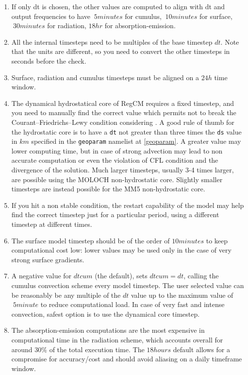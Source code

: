 \begin{enumerate}
\item If only dt is chosen, the other values are computed to align with dt
and output frequencies to have $~5minutes$ for cumulus, $~10minutes$ for
surface, $~30 minutes$ for radiation, $18hr$ for absorption-emission.
\item All the internal timesteps need to be multiples of the base
timestep $dt$.  Note that the units are different, so you need to convert the
other timesteps in seconds before the check.
\item Surface, radiation and cumulus timesteps must be aligned on a $24h$
time window.
\item The dynamical hydrostatical core of RegCM requires a fixed timestep,
and you need to manually find the correct value which permits not to break
the Courant–Friedrichs–Lewy condition considering \cite{CFL}.
A good rule of thumb for the hydrostatic core is to have a \verb=dt= not
greater than three times the \verb=ds= value in $km$ specified in the
\verb=geoparam= namelist at \ref{geoparam}.
A greater value may lower computing time, but in case of strong advection
may lead to non accurate computation or even the violation of CFL condition
and the divergence of the solution.
Much larger timesteps, usually 3-4 times larger, are possible using the
MOLOCH non-hydrostatic core. Slightly smaller timesteps are instead possible
for the MM5 non-hydrostatic core.
\item If you hit a non stable condition, the restart capability of the model
may help find the correct timestep just for a particular period, using a
different timestep at different times.
\item The surface model timestep should be of the order of $10 minutes$ to
keep computational cost low: lower values may be used only in the case of
very strong surface gradients.
\item A negative value for $dtcum$ (the default), sets $dtcum = dt$,
calling the cumulus convection scheme every model timestep. The user selected
value can be reasonably be any multiple of the $dt$ value up to the
maximum value of $~5minute$ to reduce computational load.
In case of very fast and intense convection, safest option is to use the
dynamical core timestep.
\item The absorption-emission computations are the most expensive in
computational time in the radiation scheme, which accounts overall for
around $30\%$ of the total execution time. The $18 hours$ default
allows for a compromise for accuracy/cost and should avoid aliasing on a
daily timeframe window.
\end{enumerate}


